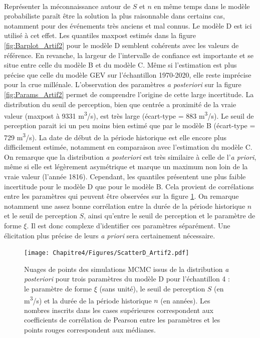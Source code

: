 	\paragraph{} Représenter la méconnaissance autour de $S$ et $n$ en même temps dans le modèle probabiliste paraît être la solution la plus raisonnable dans certains cas, notamment pour des événements très anciens et mal connus. Le modèle D est ici utilisé à cet effet. Les quantiles maxpost estimés dans la figure \ref{fig:Barplot_Artif2} pour le modèle D semblent cohérents avec les valeurs de référence. En revanche, la largeur de l'intervalle de confiance est importante et se situe entre celle du modèle B et du modèle C. Même si l'estimation est plus précise que celle du modèle GEV sur l'échantillon 1970-2020, elle reste imprécise pour la crue millénale. L'observation des paramètres \textit{a posteriori} sur la figure \ref{fig:Params_Artif2} permet de comprendre l'origine de cette large incertitude. La distribution du seuil de perception, bien que centrée a proximité de la vraie valeur (maxpost à 9331 m\textsuperscript{3}/s), est très large (écart-type = 883 m\textsuperscript{3}/s). Le seuil de perception parait ici un peu moins bien estimé que par le modèle B (écart-type = 729 m\textsuperscript{3}/s). La date de début de la période historique est elle encore plus difficilement estimée, notamment en comparaison avec l'estimation du modèle C. On remarque que la distribution \textit{a posteriori} est très similaire à celle de l'\textit{a priori}, même si elle est légèrement asymétrique et marque un maximum non loin de la vraie valeur (l'année 1816). Cependant, les quantiles présentent une plus faible incertitude pour le modèle D que pour le modèle B. Cela provient de corrélations entre les paramètres qui peuvent être observées sur la figure \ref{fig:ScatterD_Artif2}. On remarque notamment une assez bonne corrélation entre la durée de la période historique $n$ et le seuil de perception $S$, ainsi qu'entre le seuil de perception et le paramètre de forme $\xi$. Il est donc complexe d'identifier ces paramètres séparément. Une élicitation plus précise de leurs \textit{a priori} sera certainement nécessaire.
	
	\begin{figure}[h]
		\centering
		\texttt{[image: Chapitre4/Figures/ScatterD\_Artif2.pdf]}
		\caption{Nuages de points des simulations MCMC issus de la distribution \textit{a posteriori} pour trois paramètres du modèle D pour l'échantillon 4 : le paramètre de forme $\xi$ (sans unité), le seuil de perception $S$ (en m\textsuperscript{3}/s) et la durée de la période historique $n$ (en années). Les nombres inscrits dans les cases supérieures correspondent aux coefficients de corrélation de Pearson entre les paramètres et les points rouges correspondent aux médianes.}
		\label{fig:ScatterD_Artif2}
	\end{figure}
		


